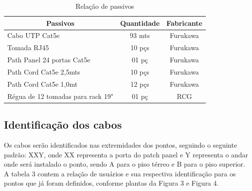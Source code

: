 \documentclass[	DIV=calc,%
							paper=a4,%
							fontsize=12pt,%
							onecolumn]{scrartcl}	 					%
\begin{document}
\begin{table}[H]
	\centering
	\caption{Relação de passivos}
\label{my-label}
\begin{tabular}{|l|c|c|}
	\hline
	\multicolumn{1}{|c|}{\textbf{Passivos}}    & \textbf{Quantidade} & \textbf{Fabricante} \\ \hline
	Cabo UTP Cat5e                             & 93 mts              & Furukawa            \\ \hline
	Tomada RJ45 & 10 pçs               & Furukawa             \\ \hline
	Path Panel 24 portas Cat5e                 & 01 pç                & Furukawa            \\ \hline
	Path Cord Cat5e  2,5mts                    & 10 pçs               & Furukawa            \\ \hline
	Path Cord Cat5e  1,0mt                     & 12 pçs              & Furukawa            \\ \hline
	Régua de 12 tomadas para rack 19"          & 01 pç                & RCG                 \\ \hline
\end{tabular}
\end{table}

\subsection{Identificação dos cabos}
Os cabos serão identificados nas extremidades dos pontos, seguindo o seguinte padrão: XXY, onde XX representa a porta do patch panel e Y representa o andar onde será instalado o ponto, sendo A para o piso térreo e B para o piso superior.
A tabela 3 contem a relação de usuários e sua respectiva identificação para os pontos que já foram definidos, conforme plantas da Figura 3 e Figura 4. 
\end{document}
